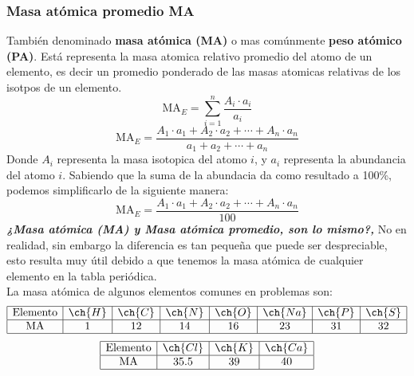 \subsubsection*{Masa atómica promedio MA}
También denominado \textbf{masa atómica (MA)} o mas comúnmente \textbf{peso atómico (PA)}. Está representa la masa atomica relativo promedio del atomo de un elemento, es decir un promedio ponderado de las masas atomicas relativas de los isotpos de un elemento.
$$ \text{MA}_E=\sum_{i=1}^{n}\frac{A_i\cdot a_i}{a_i} $$
$$ \text{MA}_E=\frac{A_1\cdot a_1+A_2\cdot a_2+\cdots+A_n\cdot a_n}{a_1+a_2+\cdots+a_n} $$
Donde $A_i$ representa la masa isotopica del atomo $i$, y $a_i$ representa la abundancia del atomo $i$. Sabiendo que la suma de la abundacia da como resultado a 100\%, podemos simplificarlo de la siguiente manera:
$$ \text{MA}_E=\frac{A_1\cdot a_1+A_2\cdot a_2+\cdots+A_n\cdot a_n}{100} $$
\textbf{\textit{¿Masa atómica (MA) y Masa atómica promedio, son lo mismo?, }} No en realidad, sin embargo la diferencia es tan pequeña que puede ser despreciable, esto resulta muy útil debido a que tenemos la masa atómica de cualquier elemento en la tabla periódica. \\
La masa atómica de algunos elementos comunes en problemas son:
$$
\begin{array} {|c|c|c|c|c|c|c|c|}
	\hline \text{Elemento} & \ch{H} & \ch{C} & \ch{N} & \ch{O} & \ch{Na} & \ch{P} & \ch{S} \\
	\hline \text{MA} & 1 & 12 & 14 & 16 & 23 & 31 & 32 \\
	\hline
\end{array}
$$
$$
\begin{array} {|c|c|c|c|}
	\hline \text{Elemento} & \ch{Cl} & \ch{K} & \ch{Ca} \\
	\hline \text{MA} & 35.5 & 39 & 40 \\
	\hline
\end{array}
$$
